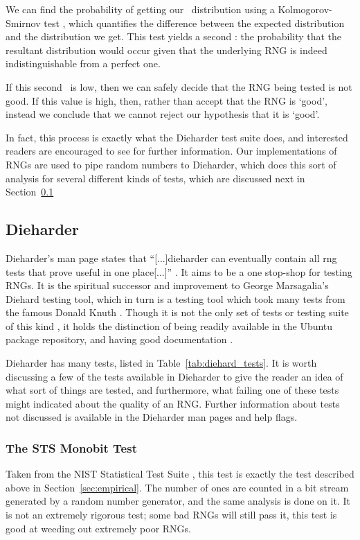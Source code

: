 We can find the probability of getting our \pvalue~distribution using a Kolmogorov-Smirnov test \cite{}, which quantifies the difference between the expected distribution and the \pvalue distribution we get. This test yields a second \pvalue: the probability that the resultant distribution would occur given that the underlying RNG is indeed indistinguishable from a perfect one.

If this second \pvalue~is low, then we can safely decide that the RNG being tested is not good. If this value is high, then, rather than accept that the RNG is `good', instead we conclude that we cannot reject our hypothesis that it is `good'.

In fact, this process is exactly what the Dieharder test suite does, and interested readers are encouraged to see \cite{dieharder_manual} for further information. Our implementations of RNGs are used to pipe random numbers to Dieharder, which does this sort of analysis for several different kinds of tests, which are discussed next in Section~\ref{sec:dieharder}

\subsection{Dieharder}
\label{sec:dieharder}

Dieharder's man page states that ``[...]dieharder can eventually contain all rng tests that prove useful in one place[...]'' \cite{dieharder_website}. It aims to be a one stop-shop for testing RNGs. It is the spiritual successor and improvement to George Marsagalia's Diehard testing tool, which in turn is a testing tool which took many tests from the famous Donald Knuth \cite{diehard}. Though it is not the only set of tests or testing suite of this kind \cite{donald1999art,diehard,nisttoolkit,L'Ecuyer:2007:TCL:1268776.1268777}, it holds the distinction of being readily available in the Ubuntu package repository, and having good documentation \cite{dieharder_manual}.

Dieharder has many tests, listed in Table~\ref{tab:diehard_tests}. It is worth discussing a few of the tests available in Dieharder to give the reader an idea of what sort of things are tested, and furthermore, what failing one of these tests might indicated about the quality of an RNG. Further information about tests not discussed is available in the Dieharder man pages and help flags.



\subsubsection{The STS Monobit Test}
Taken from the NIST Statistical Test Suite \cite{nisttoolkit}, this test is exactly the test described above in Section~\ref{sec:empirical}. The number of ones are counted in a bit stream generated by a random number generator, and the same analysis is done on it. It is not an extremely rigorous test; some bad RNGs will still pass it, this test is good at weeding out extremely poor RNGs.

